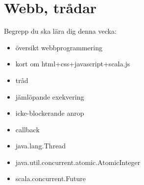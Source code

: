 \chapter{Webb, trådar}\label{chapter:W12}
Begrepp du ska lära dig denna vecka:
\begin{itemize}[noitemsep,label={$\square$},leftmargin=*]
\item översikt webbprogrammering
\item kort om html+css+javascript+scala.js
\item tråd
\item jämlöpande exekvering
\item icke-blockerande anrop
\item callback
\item java.lang.Thread
\item java.util.concurrent.atomic.AtomicInteger
\item scala.concurrent.Future\end{itemize}
